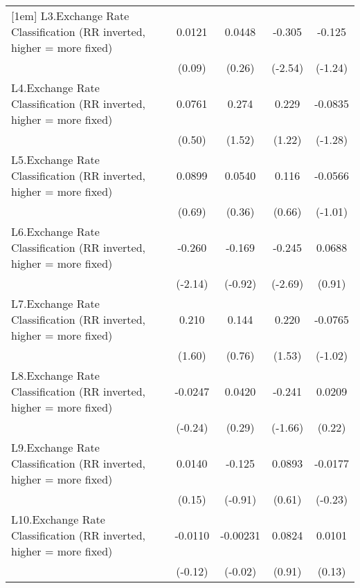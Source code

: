 {\begin{longtable}{l*{4}{c}}
[1em]
L3.Exchange Rate Classification (RR inverted, higher = more fixed)&   0.0121         &   0.0448         &   -0.305\sym{*}  &   -0.125         \\
                &   (0.09)         &   (0.26)         &  (-2.54)         &  (-1.24)         \\
[1em]
L4.Exchange Rate Classification (RR inverted, higher = more fixed)&   0.0761         &    0.274         &    0.229         &  -0.0835         \\
                &   (0.50)         &   (1.52)         &   (1.22)         &  (-1.28)         \\
[1em]
L5.Exchange Rate Classification (RR inverted, higher = more fixed)&   0.0899         &   0.0540         &    0.116         &  -0.0566         \\
                &   (0.69)         &   (0.36)         &   (0.66)         &  (-1.01)         \\
[1em]
L6.Exchange Rate Classification (RR inverted, higher = more fixed)&   -0.260\sym{*}  &   -0.169         &   -0.245\sym{**} &   0.0688         \\
                &  (-2.14)         &  (-0.92)         &  (-2.69)         &   (0.91)         \\
[1em]
L7.Exchange Rate Classification (RR inverted, higher = more fixed)&    0.210         &    0.144         &    0.220         &  -0.0765         \\
                &   (1.60)         &   (0.76)         &   (1.53)         &  (-1.02)         \\
[1em]
L8.Exchange Rate Classification (RR inverted, higher = more fixed)&  -0.0247         &   0.0420         &   -0.241         &   0.0209         \\
                &  (-0.24)         &   (0.29)         &  (-1.66)         &   (0.22)         \\
[1em]
L9.Exchange Rate Classification (RR inverted, higher = more fixed)&   0.0140         &   -0.125         &   0.0893         &  -0.0177         \\
                &   (0.15)         &  (-0.91)         &   (0.61)         &  (-0.23)         \\
[1em]
L10.Exchange Rate Classification (RR inverted, higher = more fixed)&  -0.0110         & -0.00231         &   0.0824         &   0.0101         \\
                &  (-0.12)         &  (-0.02)         &   (0.91)         &   (0.13)         \\

\end{longtable}}
